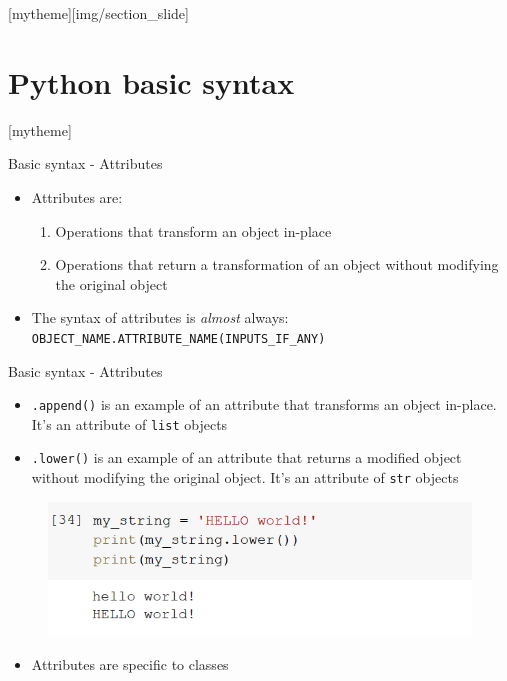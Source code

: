 \documentclass[aspectratio=169]{beamer}
\newcommand{\sectionpic}[2]{
	\setbeamertemplate{section page}[mytheme][#2]
	\section{#1}
	\setbeamertemplate{section page}[mytheme]
}
\begin{document}
\sectionpic{Python basic syntax}{img/section_slide}


\begin{frame}{Basic syntax - Attributes}

	\begin{itemize}
		\item Attributes are:
			\begin{enumerate}
				\item Operations that transform an object in-place
				\item Operations that return a transformation of an object without modifying the original object
			\end{enumerate}
		\item The syntax of attributes is \textit{almost} always: \texttt{OBJECT\_NAME.ATTRIBUTE\_NAME(INPUTS\_IF\_ANY)}
	\end{itemize}

\end{frame}

\begin{frame}{Basic syntax - Attributes}

	\begin{itemize}
		\item \texttt{.append()} is an example of an attribute that transforms an object in-place. It's an attribute of \texttt{list} objects
		\item \texttt{.lower()} is an example of an attribute that returns a modified object without modifying the original object. It's an attribute of \texttt{str} objects
	\end{itemize}

	\begin{figure}
		\centering
		\includegraphics[width=0.6\linewidth]{img/string_lower.png}
	\end{figure}

	\begin{itemize}
		\item Attributes are specific to classes
	\end{itemize}

\end{frame}
\end{document}
